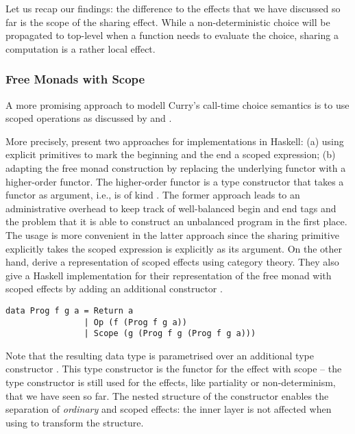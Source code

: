 Let us recap our findings: the difference to the effects that we have discussed so far is the scope of the sharing effect.
While a non-deterministic choice will be propagated to top-level when a function needs to evaluate the choice, sharing a computation is a rather local effect.

\subsubsection{Free Monads with Scope}

A more promising approach to modell Curry's call-time choice semantics is to use scoped operations as discussed by \citet{wu2014effect} and \citet{pirog2018syntax}.

More precisely, \citeauthor{wu2014effect} present two approaches for implementations in Haskell: (a) using explicit primitives to mark the beginning and the end a scoped expression; (b) adapting the free monad construction by replacing the underlying functor with a higher-order functor.
The higher-order functor is a type constructor that takes a functor as argument, i.e., is of kind \hinl{(* -> *) -> * -> *}.
The former approach leads to an administrative overhead to keep track of well-balanced begin and end tags and the problem that it is able to construct an unbalanced program in the first place.
The usage is more convenient in the latter approach since the sharing primitive explicitly takes the scoped expression is explicitly as its argument.
On the other hand, \citeauthor{pirog2018syntax} derive a representation of scoped effects using category theory.
They also give a Haskell implementation for their representation of the free monad with scoped effects by adding an additional constructor .

\begin{verbatim}
data Prog f g a = Return a
                | Op (f (Prog f g a))
                | Scope (g (Prog f g (Prog f g a)))
\end{verbatim}

Note that the resulting data type  is parametrised over an additional type constructor .
This type constructor is the functor for the effect with scope -- the type constructor  is still used for the effects, like partiality or non-determinism, that we have seen so far.
The nested structure of the  constructor enables the separation of \emph{ordinary} and scoped effects: the inner  layer is not affected when using \hinl{(>>=)} to transform the structure.

